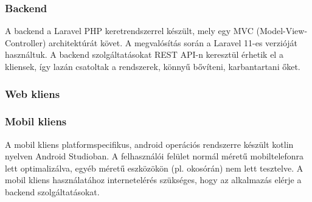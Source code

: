 \subsubsection{Backend}

A backend a Laravel PHP keretrendszerrel \cite{LaravelDocs} készült, mely egy MVC (Model-View-Controller) architektúrát követ. A megvalósítás során a Laravel 11-es verzióját használtuk. A backend szolgáltatásokat REST API-n keresztül érhetik el a kliensek, így lazán csatoltak a rendszerek, könnyű bővíteni, karbantartani őket.

\subsubsection{Web kliens}

\subsubsection{Mobil kliens}
A mobil kliens platformspecifikus, android operációs rendszerre készült kotlin nyelven Android Studioban.
A felhasználói felület normál méretű mobiltelefonra lett optimalizálva, egyéb méretű eszközökön (pl. okosórán) nem lett tesztelve.
A mobil kliens használatához internetelérés szükséges, hogy az alkalmazás elérje a backend szolgáltatásokat. 